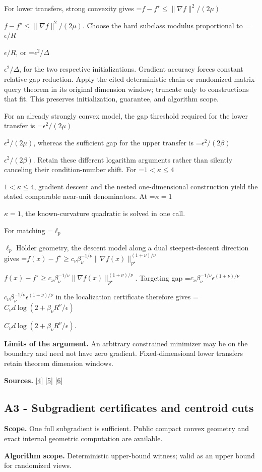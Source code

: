 \documentclass[10pt,a4paper]{article}
\newcommand{\AtlasMath}[1]{\par\begingroup\centering\setbox0=\hbox{$\displaystyle #1$}\ifdim\wd0>1.4\linewidth\typeout{ATLAS WIDE FORMULA: \the\wd0}\fi\ifdim\wd0>\linewidth\resizebox{\linewidth}{!}{\box0}\else\box0\fi\par\endgroup}
\newcommand{\AtlasInlineMath}[1]{\begingroup\setbox0=\hbox{$#1$}\ifdim\wd0>.4\linewidth\endgroup\AtlasMath{#1}\else\endgroup$#1$\fi}
\begin{document}
For lower transfers, strong convexity gives \AtlasInlineMath{f-f^\star\le\|\nabla f\|^2/(2\mu)}. Choose the hard subclass modulus proportional to \AtlasInlineMath{\epsilon/R}, or \AtlasInlineMath{\epsilon^2/\Delta}, for the two respective initializations. Gradient accuracy forces constant relative gap reduction. Apply the cited deterministic chain or randomized matrix-query theorem in its original dimension window; truncate only to constructions that fit. This preserves initialization, guarantee, and algorithm scope.

For an already strongly convex model, the gap threshold required for the lower transfer is \AtlasInlineMath{\epsilon^2/(2\mu)}, whereas the sufficient gap for the upper transfer is \AtlasInlineMath{\epsilon^2/(2\beta)}. Retain these different logarithm arguments rather than silently canceling their condition-number shift. For \AtlasInlineMath{1<\kappa\le4}, gradient descent and the nested one-dimensional construction yield the stated comparable near-unit denominators. At \AtlasInlineMath{\kappa=1}, the known-curvature quadratic is solved in one call.

For matching \AtlasInlineMath{\ell_p} Hölder geometry, the descent model along a dual steepest-descent direction gives
\AtlasInlineMath{f(x)-f^\star\ge c_\nu\beta_\nu^{-1/\nu}\|\nabla f(x)\|_{p^\star}^{(1+\nu)/\nu}}.
Targeting gap \AtlasInlineMath{c_\nu\beta_\nu^{-1/\nu}\epsilon^{(1+\nu)/\nu}} in the localization certificate therefore gives
\AtlasInlineMath{C_\nu d\log(2+\beta_\nu R^\nu/\epsilon)}.

\textbf{Limits of the argument.} An arbitrary constrained minimizer may be on the boundary and need not have zero gradient. Fixed-dimensional lower transfers retain theorem dimension windows.

\textbf{Sources.} \href{https://arxiv.org/pdf/2101.09740v2}{[4]} \href{https://arxiv.org/pdf/2609.33360v2}{[5]} \href{https://arxiv.org/pdf/2609.10874}{[6]}

\subsection{A3 - Subgradient certificates and centroid cuts}
\textbf{Scope.} One full subgradient is sufficient. Public compact convex geometry and exact internal geometric computation are available.

\textbf{Algorithm scope.} Deterministic upper-bound witness; valid as an upper bound for randomized views.
\end{document}
